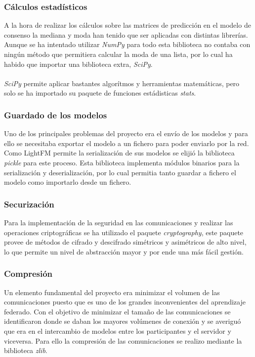 \subsubsection{Cálculos estadísticos} 
A la hora de realizar los cálculos sobre las matrices de predicción en el modelo de consenso la mediana y moda han tenido que ser aplicadas con distintas librerías. Aunque se ha intentado utilizar \textit{NumPy} para todo esta biblioteca no contaba con ningún método que permitiera calcular la moda de una lista, por lo cual ha habido que importar una biblioteca extra, \textit{SciPy}.
\\ \\
\textit{SciPy} permite aplicar bastantes algorítmos y herramientas matemáticas, pero solo se ha importado su paquete de funciones estádisticas \textit{stats}. 
\subsubsection{Guardado de los modelos}
Uno de los principales problemas del proyecto era el envío de los modelos y para ello se necesitaba exportar el modelo a un fichero para poder enviarlo por la red. Como LightFM permite la serialización de sus modelos se elijió la biblioteca \textit{pickle} para este proceso. Esta biblioteca implementa módulos binarios para la serialización y deserialización, por lo cual permitia tanto guardar a fichero el modelo como importarlo desde un fichero.
\subsubsection{Securización} 
Para la implementación de la seguridad en las comunicaciones y realizar las operaciones criptográficas se ha utilizado el paquete \textit{cryptography}, este paquete provee de métodos de cifrado y descifrado simétricos y asimétricos de alto nivel, lo que permite un nivel de abstracción mayor y por ende una más fácil gestión. 
\subsubsection{Compresión}
Un elemento fundamental del proyecto era minimizar el volumen de las comunicaciones puesto que es uno de los grandes inconvenientes del aprendizaje federado. Con el objetivo de minimizar el tamaño de las comunicaciones se identificaron donde se daban los mayores volúmenes de conexión y se averiguó que era en el intercambio de modelos entre los participantes y el servidor y viceversa. Para ello la compresión de las comunicaciones se realizo mediante la biblioteca \textit{zlib}. 

